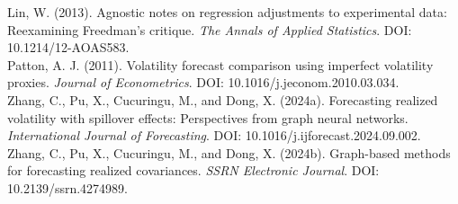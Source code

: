 \documentclass[11pt,a4paper]{article}
\begin{document}
Lin, W. (2013). Agnostic notes on regression adjustments to experimental data: Reexamining Freedman's critique. \textit{The Annals of Applied Statistics}. DOI: 10.1214/12-AOAS583.\\
Patton, A. J. (2011). Volatility forecast comparison using imperfect volatility proxies. \textit{Journal of Econometrics}. DOI: 10.1016/j.jeconom.2010.03.034.\\
Zhang, C., Pu, X., Cucuringu, M., and Dong, X. (2024a). Forecasting realized volatility with spillover effects: Perspectives from graph neural networks. \textit{International Journal of Forecasting}. DOI: 10.1016/j.ijforecast.2024.09.002.\\
Zhang, C., Pu, X., Cucuringu, M., and Dong, X. (2024b). Graph-based methods for forecasting realized covariances. \textit{SSRN Electronic Journal}. DOI: 10.2139/ssrn.4274989.
\end{document}
